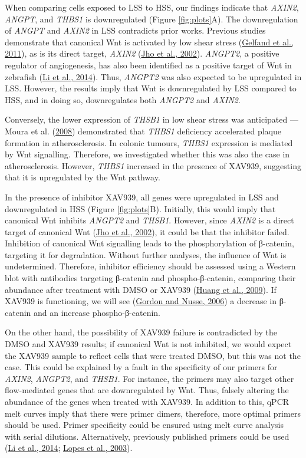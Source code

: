 \documentclass[
  11pt,
]{article}
\begin{document}
When comparing cells exposed to LSS to HSS, our findings indicate that \emph{AXIN2}, \emph{ANGPT}, and \emph{THBS1} is downregulated (Figure \ref{fig:plots}A).
The downregulation of \emph{ANGPT} and \emph{AXIN2} in LSS contradicts prior works.
Previous studies demonstrate that canonical Wnt is activated by low shear stress (\protect\hyperlink{ref-Gelfand2011}{Gelfand et al., 2011}), as is its direct target, \emph{AXIN2} (\protect\hyperlink{ref-Jho2002}{Jho et al., 2002}).
\emph{ANGPT2}, a positive regulator of angiogenesis, has also been identified as a positive target of Wnt in zebrafish (\protect\hyperlink{ref-Li2014-mx}{Li et al., 2014}).
Thus, \emph{ANGPT2} was also expected to be upregulated in LSS.
However, the results imply that Wnt is downregulated by LSS compared to HSS, and in doing so, downregulates both \emph{ANGPT2} and \emph{AXIN2}.

Conversely, the lower expression of \emph{THSB1} in low shear stress was anticipated --- Moura et al. (\protect\hyperlink{ref-Moura2008}{2008}) demonstrated that \emph{THBS1} deficiency accelerated plaque formation in atherosclerosis.
In colonic tumours, \emph{THBS1} expression is mediated by Wnt signalling.
Therefore, we investigated whether this was also the case in atherosclerosis.
However, \emph{THBS1} increased in the presence of XAV939, suggesting that it is upregulated by the Wnt pathway.

In the presence of inhibitor XAV939, all genes were upregulated in LSS and downregulated in HSS (Figure \ref{fig:plots}B).
Initially, this would imply that canonical Wnt inhibits \emph{ANGPT2} and \emph{THSB1}.
However, since \emph{AXIN2} is a direct target of canonical Wnt (\protect\hyperlink{ref-Jho2002}{Jho et al., 2002}), it could be that the inhibitor failed.
Inhibition of canonical Wnt signalling leads to the phosphorylation of β-catenin, targeting it for degradation.
Without further analyses, the influence of Wnt is undetermined.
Therefore, inhibitor efficiency should be assessed using a Western blot with antibodies targeting β-catenin and phospho-β-catenin, comparing their abundance after treatment with DMSO or XAV939 (\protect\hyperlink{ref-Huang2009}{Huang et al., 2009}).
If XAV939 is functioning, we will see (\protect\hyperlink{ref-gordon2006}{Gordon and Nusse, 2006}) a decrease in β-catenin and an increase phospho-β-catenin.

On the other hand, the possibility of XAV939 failure is contradicted by the DMSO and XAV939 results; if canonical Wnt is not inhibited, we would expect the XAV939 sample to reflect cells that were treated DMSO, but this was not the case.
This could be explained by a fault in the specificity of our primers for \emph{AXIN2}, \emph{ANGPT2}, and \emph{THSB1}.
For instance, the primers may also target other flow-mediated genes that are downregulated by Wnt.
Thus, falsely altering the abundance of the genes when treated with XAV939.
In addition to this, qPCR melt curves imply that there were primer dimers, therefore, more optimal primers should be used.
Primer specificity could be ensured using melt curve analysis with serial dilutions.
Alternatively, previously published primers could be used (\protect\hyperlink{ref-Li2014-mx}{Li et al., 2014}; \protect\hyperlink{ref-lopes2003}{Lopes et al., 2003}).
\end{document}
